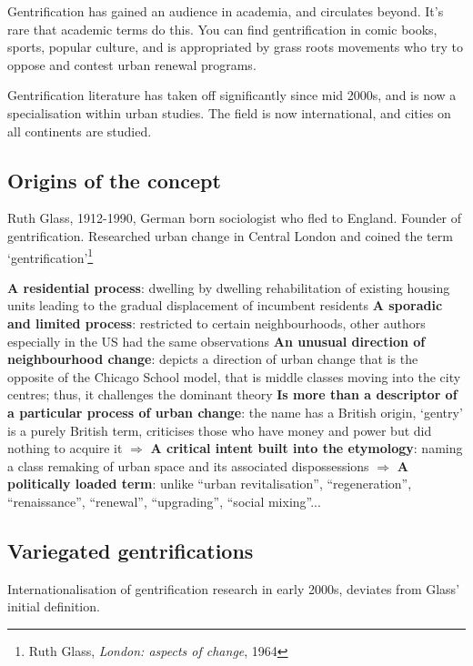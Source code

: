 \documentclass{article}
\begin{document}
Gentrification has gained an audience in academia, and circulates beyond. It's rare that academic terms do this. You can find gentrification in comic books, sports, popular culture, and is appropriated by grass roots movements who try to oppose and contest urban renewal programs.

Gentrification literature has taken off significantly since mid 2000s, and is now a specialisation within urban studies. The field is now international, and cities on all continents are studied.

\subsection{Origins of the concept}

Ruth Glass, 1912-1990, German born sociologist who fled to England. Founder of gentrification.
Researched urban change in Central London and coined the term `gentrification'\footnote{Ruth Glass, \textit{London: aspects of change}, 1964}

\begin{outline}
	\1 \textbf{A residential process}: dwelling by dwelling rehabilitation of existing housing units leading to the gradual displacement of incumbent residents
	\1 \textbf{A sporadic and limited process}: restricted to certain neighbourhoods, other authors especially in the US had the same observations
	\1 \textbf{An unusual direction of neighbourhood change}: depicts a direction of urban change that is the opposite of the Chicago School model, that is middle classes moving into the city centres; thus, it challenges the dominant theory
	\1 \textbf{Is more than a descriptor of a particular process of urban change}: the name has a British origin, `gentry' is a purely British term, criticises those who have money and power but did nothing to acquire it
	\1 $\Rightarrow$ \textbf{A critical intent built into the etymology}: naming a class remaking of urban space and its associated dispossessions
	\1 $\Rightarrow$ \textbf{A politically loaded term}: unlike ``urban revitalisation'', ``regeneration'', ``renaissance'', ``renewal'', ``upgrading'', ``social mixing''...
\end{outline}

\subsection{Variegated gentrifications}

Internationalisation of gentrification research in early 2000s, deviates from Glass' initial definition.
\end{document}
